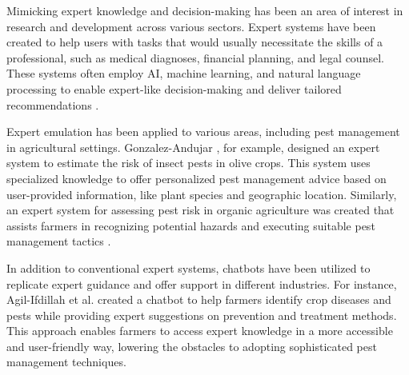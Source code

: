 Mimicking expert knowledge and decision-making has been an area of interest in research and development across various sectors. Expert systems have been created to help users with tasks that would usually necessitate the skills of a professional, such as medical diagnoses, financial planning, and legal counsel. These systems often employ AI, machine learning, and natural language processing to enable expert-like decision-making and deliver tailored recommendations \cite{durkin1994expert, charniak_mcdermott_1988}.

Expert emulation has been applied to various areas, including pest management in agricultural settings. Gonzalez-Andujar \cite{jose_article}, for example, designed an expert system to estimate the risk of insect pests in olive crops. This system uses specialized knowledge to offer personalized pest management advice based on user-provided information, like plant species and geographic location. Similarly, an expert system for assessing pest risk in organic agriculture was created that assists farmers in recognizing potential hazards and executing suitable pest management tactics \cite{MCKINION198531}.

In addition to conventional expert systems, chatbots have been utilized to replicate expert guidance and offer support in different industries. For instance, Agil-Ifdillah et al. \cite{reset.org_2022} created a chatbot to help farmers identify crop diseases and pests while providing expert suggestions on prevention and treatment methods. This approach enables farmers to access expert knowledge in a more accessible and user-friendly way, lowering the obstacles to adopting sophisticated pest management techniques.
